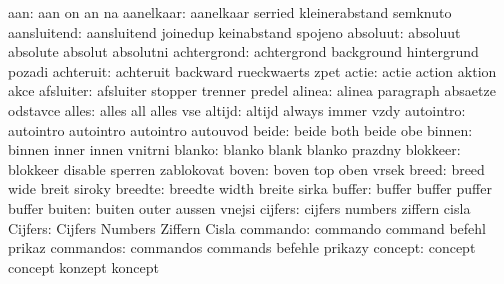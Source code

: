                 aan:  aan                  on                  an
                      na
          aanelkaar:  aanelkaar            serried             kleinerabstand
                      semknuto
        aansluitend:  aansluitend          joinedup            keinabstand
                      spojeno
           absoluut:  absoluut             absolute            absolut
                      absolutni
        achtergrond:  achtergrond          background          hintergrund
                      pozadi
          achteruit:  achteruit            backward            rueckwaerts
                      zpet
              actie:  actie                action              aktion
                      akce
          afsluiter:  afsluiter            stopper             trenner
                      predel
             alinea:  alinea               paragraph           absaetze
                      odstavce %
              alles:  alles                all                 alles
                      vse
             altijd:  altijd               always              immer
                      vzdy
          autointro:  autointro            autointro           autointro
                      autouvod
              beide:  beide                both                beide
                      obe
             binnen:  binnen               inner               innen
                      vnitrni
             blanko:  blanko               blank               blanko
                      prazdny
           blokkeer:  blokkeer             disable             sperren
                      zablokovat
              boven:  boven                top                 oben
                      vrsek
              breed:  breed                wide                breit
                      siroky
            breedte:  breedte              width               breite
                      sirka
             buffer:  buffer               buffer              puffer
                      buffer
             buiten:  buiten               outer               aussen
                      vnejsi
            cijfers:  cijfers              numbers             ziffern
                      cisla
            Cijfers:  Cijfers              Numbers             Ziffern
                      Cisla
           commando:  commando             command             befehl
                      prikaz
          commandos:  commandos            commands            befehle
                      prikazy
            concept:  concept              concept             konzept
                      koncept
